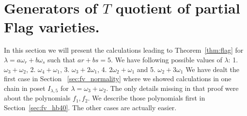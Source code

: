 \section{Generators of \(T\) quotient of partial Flag varieties.}
\label{sec:fv_hb}

In this section we will present the calculations leading to Theorem~\ref{thm:flag} for \(\lambda=a\omega_r+b\omega_s\) such that \(ar+bs = 5\). We have following possible values of \(\lambda\): 1. \(\omega_3+\omega_2\), 2. \(\omega_4+\omega_1\), 3. \(\omega_3+2\omega_1\), 4. \(2\omega_2+\omega_1\) and 5. \(\omega_2+3\omega_1\) We have dealt the first case in Section ~\ref{sec:fv_normality} where we showed calculations in one chain in poset \(I_{\lambda,5}\) for \(\lambda = \omega_3+\omega_2\).  The only details missing in that proof were about the polynomials $f_1, f_2$. We describe those polynomials first in Section~\ref{sec:fv_hb40}. The other cases are actually easier.
